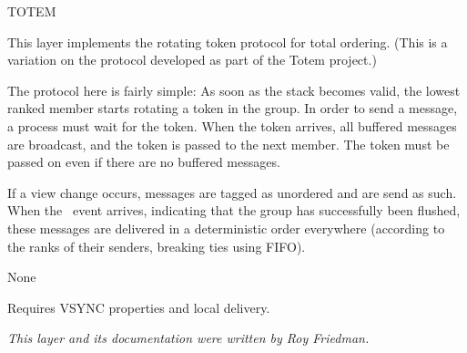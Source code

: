 \begin{Layer}{TOTEM}

This layer implements the rotating token protocol for total ordering.  (This is
a variation on the protocol developed as part of the Totem project.)

\begin{Protocol}
The protocol here is fairly simple: As soon as the stack becomes valid, the
lowest ranked member starts rotating a token in the group. In order to send a
message, a process must wait for the token. When the token arrives, all
buffered messages are broadcast, and the token is passed to the next member.
The token must be passed on even if there are no buffered messages.

If a view change occurs, messages are tagged as unordered and are send as
such.
When the \UpView\ event arrives, indicating that the group has successfully
been flushed, these messages are delivered in a deterministic order everywhere
(according to the ranks of their senders, breaking ties using FIFO).
\end{Protocol}

\begin{Parameters}
\item None
\end{Parameters}

\begin{Properties}
\item
Requires VSYNC properties and local delivery.
\end{Properties}

\begin{Sources}
\end{Sources}

\begin{GenEvent}
\genevent{\DnAck}
\genevent{\DnCast}
\end{GenEvent}

\begin{Testing}
\item
\todo{}
\end{Testing}

\emph{This layer and its documentation were written by Roy Friedman.}
\end{Layer}
